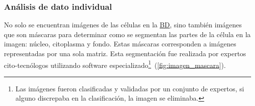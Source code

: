 \begin{table}[H]
    \centering
    \caption{Resultados del análisis exploratorio de datos de la base de datos de entrenamiento}\label{tabla:exploratorio}
    \end{table}
 
\begin{table}[H]
    \centering
    \caption{Análisis de dimensiones}\label{tabla:dimensiones}
    \end{table}

\subsubsection{Análisis de dato individual}

No solo se encuentran imágenes de las células en la \hyperlink{abbr}{BD}, sino
también imágenes que son máscaras para determinar como se segmentan las partes
de la célula en la imagen: núcleo, citoplasma y fondo. Estas máscaras
corresponden a imágenes representadas por una sola matriz. Esta segmentación fue
realizada por expertos cito-tecnólogos utilizando software
especializado\footnote{Las imágenes fueron clasificadas y validadas por un
conjunto de expertos, si alguno discrepaba en la clasificación, la imagen se
eliminaba.}~(\autoref{fig:imagen_mascara}).

